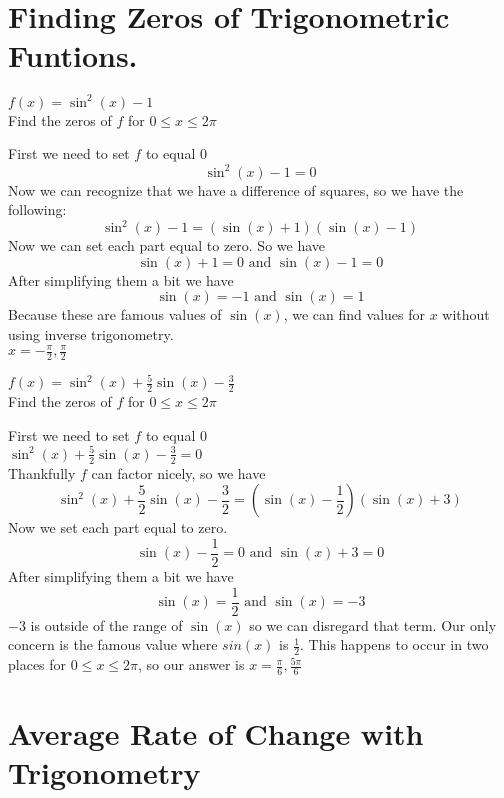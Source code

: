 \documentclass{ximera}
\begin{document}
\section{Finding Zeros of Trigonometric Funtions.}
\begin{example}
$f(x)=\sin^2(x)-1$\\
Find the zeros of $f$ for $0\leq x \leq 2\pi$\\
\begin{explanation}
First we need to set $f$ to equal $0$\\
\[
\sin^2(x)-1=0
\]
Now we can recognize that we have a difference of squares, so we have the following:
\[
\sin^2(x)-1=(\sin(x)+1)(\sin(x)-1)
\]
Now we can set each part equal to zero. So we have
\[
\sin(x)+1=0 \text{ and } \sin(x)-1 =0
\]
After simplifying them a bit we  have
\[
\sin(x) =-1 \text{ and } \sin(x)=1
\]
Because these are famous values of $\sin(x)$, we can find values for $x$ without using inverse trigonometry.\\
$x=-\frac{\pi}{2},\frac{\pi}{2}$

\end{explanation}
\end{example}

\begin{example}
$f(x)=\sin^2(x)+\frac{5}{2}\sin(x)-\frac{3}{2}$\\
Find the zeros of $f$ for $0\leq x \leq 2\pi$\\
\begin{explanation}
First we need to set $f$ to equal $0$\\
$\sin^2(x)+\frac{5}{2}\sin(x)-\frac{3}{2}=0$\\
Thankfully $f$ can factor nicely, so we have\\
\[
\sin^2(x)+\frac{5}{2}\sin(x)-\frac{3}{2}= (\sin(x)-\frac{1}{2})(\sin(x)+3)
\]
Now we set each part equal to zero.
\[
\sin(x)-\frac{1}{2}=0 \text{ and } \sin(x)+3 =0
\]
After simplifying them a bit we  have
\[
\sin(x) = \frac{1}{2} \text{ and } \sin(x)=-3
\]
$-3$ is outside of the range of $\sin(x)$ so we can disregard that term. Our only concern is the famous value where $sin(x)$ is $\frac{1}{2}$. This happens to occur in two places for $0\leq x \leq 2\pi$, so our answer is $x=\frac{\pi}{6},\frac{5\pi}{6}$
\end{explanation}
\end{example}


\section{Average Rate of Change with Trigonometry}
\end{document}
